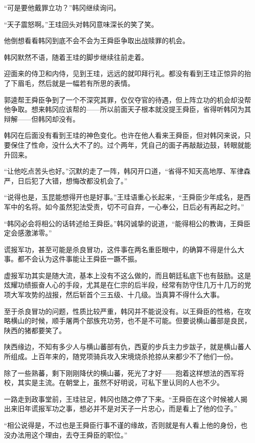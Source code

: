 “可是要他戴罪立功？”韩冈继续询问。

“天子震怒啊。”王珪回头对韩冈意味深长的笑了笑。

他倒想看看韩冈到底不会不会为王舜臣争取出战赎罪的机会。

韩冈默然不语，随着王珪的脚步继续往前走着。

迎面来的侍卫和内侍，见到王珪，远远的就叩拜行礼。都没有看到王珪正惊异的抬了下眉毛，然后就是一幅若有所思的表情。

郭逵帮王舜臣争到了一个不深究其罪，仅仅夺官的待遇，但上阵立功的机会却没帮他争取。想来韩冈应该帮的——所以前面天子根本就没提王舜臣，省得听韩冈为其辩解——但韩冈却没有。

韩冈在后面没有看到王珪的神色变化。也许在他人看来王舜臣，但对韩冈来说，只要保住了性命，没什么大不了的。过个两年，凭自己的面子再敲敲边鼓，转眼就能升回来。

“让他吃点苦头也好。”沉默的走了一阵，韩冈开口道，“省得不知天高地厚、军律森严，日后犯了大错，想悔改都没机会了。”

“说得也是，玉昆能想得开也是好事。”王珪语重心长起来，“王舜臣少年成名，是西军中的名将。如今虽然犯法受责，切不可自弃，一心奉公，日后必有再起之时。”

“韩冈必会将相公的话转述给王舜臣。”韩冈诚挚的说道，“能得相公的教诲，王舜臣定会感激涕零。”

谎报军功，甚至可能是杀良冒功，这件事在两名重臣眼中，的确算不得是什么大事。都不会认为这件事能让王舜臣一蹶不振。

虚报军功其实是随大流，基本上没有不这么做的，而且朝廷私底下也有鼓励。这是炫耀功绩振奋人心的手段，尤其是在仁宗的后半段，经常有防守住几万十几万的党项大军攻势的战报，然后斩首个三五级、十几级。当真算不得什么大事。

至于杀良冒功的问题，性质比较严重，韩冈并不能说没有。以王舜臣的性格，在攻略横山的时候，顺手屠两个部族充功劳，也不是不可能。但要说横山蕃部是良民，陕西的猪都要笑了。

陕西缘边，不知有多少人与横山蕃部有仇，西夏的步兵主力步跋子，就是横山蕃人所组成。上百年来的，随党项骑兵攻入宋境烧杀抢掠从来都少不了他们一份。

除了一些熟蕃，剩下刚刚降伏的横山蕃，死光了才好——抱着这样想法的西军将校，其实是主流。在朝堂上，虽然不好明说，可私下里认同的人也不少。

一路走到政事堂前，王珪驻足，韩冈也随之停了下来。“王舜臣在这个时候被人揭出来旧年谎报军功之事，想必并不是对天子一片忠心，而是看上了他的位子。”

“相公说得是，不过也是王舜臣行事不谨的缘故，否则就是有人看上他的身份，也没办法用这个理由，去夺王舜臣的职位。”

